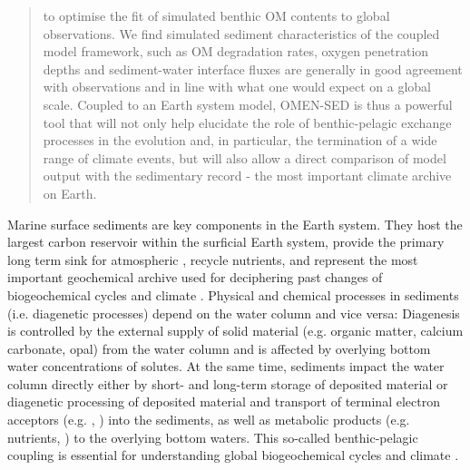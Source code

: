 \documentclass[gmd, manuscript]{copernicus}
\begin{document}
\begin{abstract}
to optimise the fit of simulated benthic OM contents to global observations. 
We find simulated sediment characteristics of the coupled model framework, such as OM degradation rates, oxygen penetration depths and sediment-water interface fluxes
are generally in good agreement with observations and in line with what one would expect on a global scale. 
Coupled to an Earth system model, OMEN-SED is thus a powerful tool that will not only help elucidate the role of benthic-pelagic exchange processes in the evolution and, in particular, the termination of a wide range of climate events, 
but will also allow a direct comparison of model output with the sedimentary record - the most important climate archive on Earth.
\end{abstract}

\newpage

% 


\introduction  %
Marine surface sediments are key components in the Earth system. They host the largest carbon reservoir within the surficial Earth system, provide the primary long term sink for atmospheric , 
recycle nutrients, and represent the most important geochemical archive used for deciphering past changes of biogeochemical cycles and climate  \citep[e.g.][]{berner:91, archer_effect_1994, ridgwell_role_2005, arndt_quantifying_2013}. 
Physical and chemical processes in sediments (i.e. diagenetic processes) depend on the water column and vice versa: Diagenesis is controlled by the external supply of solid material 
(e.g. organic matter, calcium carbonate, opal) from the water column and is affected by overlying bottom water concentrations of solutes. 
At the same time, sediments impact the water column directly either by short- and long-term storage of deposited material or diagenetic processing of deposited material and transport of terminal electron acceptors (e.g. , ) into the sediments, 
as well as metabolic products (e.g. nutrients, ) to the overlying bottom waters. 
This so-called benthic-pelagic coupling is essential for understanding global biogeochemical cycles and climate \citep[e.g.][]{archer_effect_1994, archer_what_2000, soetaert_coupling_2000, mackenzie_sediments_2005}. 
\end{document}
